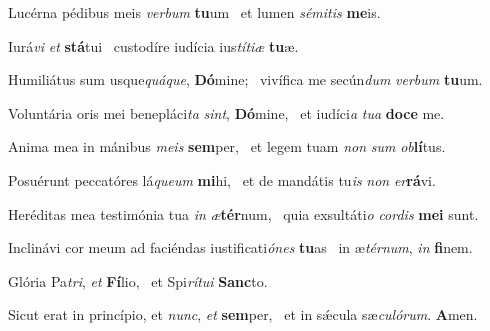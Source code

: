\item Lucérna pédibus meis \textit{verbum} \textbf{tu}um~\psstar{} et lumen \textit{sémitis} \textbf{me}is.

\item Iurá\textit{vi} \textit{et} \textbf{stá}tui~\psstar{} custodíre iudícia ius\textit{títiæ} \textbf{tu}æ.

\item Humiliátus sum usque\textit{quáque}, \textbf{Dó}mine;~\psstar{} vivífica me secún\textit{dum} \textit{verbum} \textbf{tu}um.

\item Voluntária oris mei benepláci\textit{ta} \textit{sint}, \textbf{Dó}mine,~\psstar{} et iudíci\textit{a} \textit{tua} \textbf{do}\textbf{ce} me.

\item Anima mea in mánibus \textit{meis} \textbf{sem}per,~\psstar{} et legem tuam \textit{non} \textit{sum} \textit{ob}\textbf{lí}tus.

\item Posuérunt peccatóres lá\textit{queum} \textbf{mi}hi,~\psstar{} et de mandátis tu\textit{is} \textit{non} \textit{er}\textbf{rá}vi.

\item Heréditas mea testimónia tua \textit{in} \textit{æ}\textbf{tér}num,~\psstar{} quia exsultáti\textit{o} \textit{cordis} \textbf{me}\textbf{i} sunt.

\item Inclinávi cor meum ad faciéndas iustificati\textit{ónes} \textbf{tu}as~\psstar{} in æ\textit{térnum}, \textit{in} \textbf{fi}nem.

\item Glória Pa\textit{tri}, \textit{et} \textbf{Fí}lio,~\psstar{} et Spi\textit{rítui} \textbf{Sanc}to.

\item Sicut erat in princípio, et \textit{nunc}, \textit{et} \textbf{sem}per,~\psstar{} et in sǽcula sæ\textit{culórum}. \textbf{A}men.
